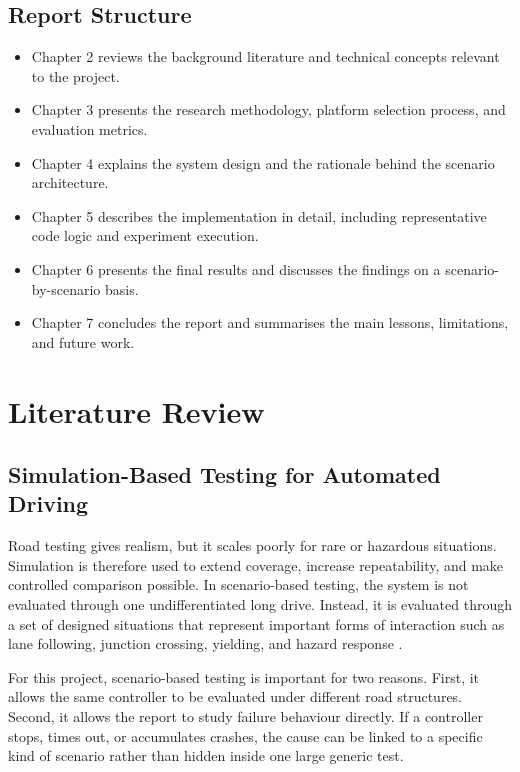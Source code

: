 \documentclass[12pt,a4paper]{report}
\begin{document}
\section{Report Structure}
\begin{itemize}
    \item Chapter 2 reviews the background literature and technical concepts relevant to the project.
    \item Chapter 3 presents the research methodology, platform selection process, and evaluation metrics.
    \item Chapter 4 explains the system design and the rationale behind the scenario architecture.
    \item Chapter 5 describes the implementation in detail, including representative code logic and experiment execution.
    \item Chapter 6 presents the final results and discusses the findings on a scenario-by-scenario basis.
    \item Chapter 7 concludes the report and summarises the main lessons, limitations, and future work.
\end{itemize}

\chapter{Literature Review}

\section{Simulation-Based Testing for Automated Driving}
Road testing gives realism, but it scales poorly for rare or hazardous situations. Simulation is therefore used to extend coverage, increase repeatability, and make controlled comparison possible. In scenario-based testing, the system is not evaluated through one undifferentiated long drive. Instead, it is evaluated through a set of designed situations that represent important forms of interaction such as lane following, junction crossing, yielding, and hazard response \cite{unece_natm,wang2024scenario,skoglund2025safety}.

For this project, scenario-based testing is important for two reasons. First, it allows the same controller to be evaluated under different road structures. Second, it allows the report to study failure behaviour directly. If a controller stops, times out, or accumulates crashes, the cause can be linked to a specific kind of scenario rather than hidden inside one large generic test.
\end{document}
